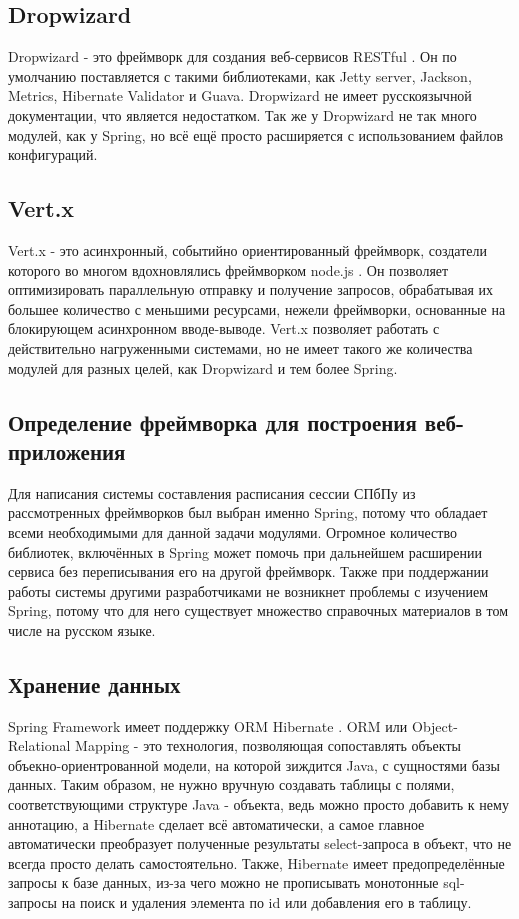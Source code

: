 \subsection{Dropwizard}
Dropwizard - это фреймворк для создания веб-сервисов RESTful \cite{dropwizard}. Он по умолчанию поставляется с такими библиотеками, как Jetty server, Jackson, Metrics, Hibernate Validator и Guava. Dropwizard не имеет русскоязычной документации, что является недостатком. Так же у Dropwizard не так много модулей, как у Spring, но всё ещё просто расширяется с использованием файлов конфигураций.

\subsection{Vert.x}
Vert.x - это асинхронный, событийно ориентированный фреймворк, создатели которого во многом вдохновлялись фреймворком node.js \cite{vertx}. Он позволяет оптимизировать параллельную отправку и получение запросов, обрабатывая их большее количество с меньшими ресурсами, нежели фреймворки, основанные на блокирующем асинхронном вводе-выводе. Vert.x позволяет работать с действительно нагруженными системами, но не имеет такого же количества модулей для разных целей, как Dropwizard и тем более Spring.

\subsection{Определение фреймворка для построения веб-приложения} 
Для написания системы составления расписания сессии СПбПу из рассмотренных фреймворков был выбран именно Spring, потому что обладает всеми необходимыми для данной задачи модулями. Огромное количество библиотек, включённых в Spring может помочь при дальнейшем расширении сервиса без переписывания его на другой фреймворк. Также при поддержании работы системы другими разработчиками не возникнет проблемы с изучением Spring, потому что для него существует множество справочных материалов в том числе на русском языке.

\subsection{Хранение данных}
Spring Framework имеет поддержку ORM Hibernate \cite{hibernate}. ORM или Object-Relational Mapping - это технология, позволяющая сопоставлять объекты объекно-ориентрованной модели, на которой зиждится Java, с сущностями базы данных. Таким образом, не нужно вручную создавать таблицы с полями, соответствующими структуре Java - объекта, ведь можно просто добавить к нему аннотацию, а Hibernate сделает всё автоматически, а самое главное автоматически преобразует полученные результаты select-запроса в объект, что не всегда просто делать самостоятельно. Также, Hibernate имеет предопределённые запросы к базе данных, из-за чего можно не прописывать монотонные sql-запросы на поиск и удаления элемента по id или добавления его в таблицу.

